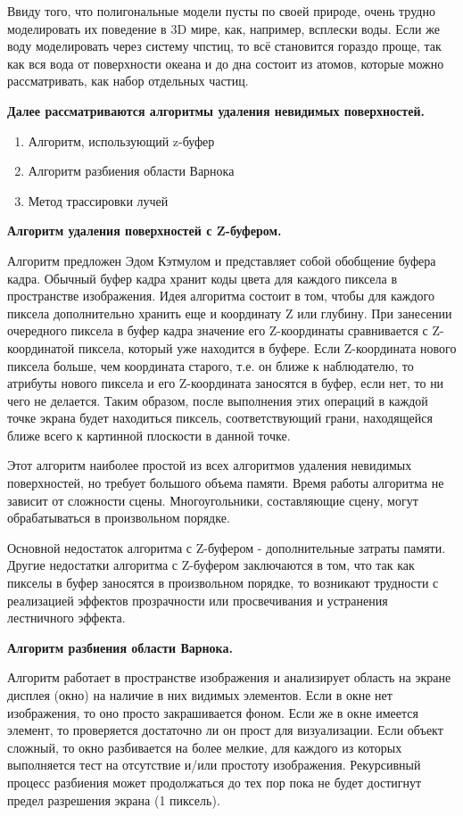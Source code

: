 Ввиду того, что полигональные модели пусты по своей природе, очень трудно моделировать их поведение в 3D мире, как, например, всплески воды. Если же воду моделировать через систему чпстиц, то всё становится гораздо проще, так как вся вода от поверхности океана и до дна состоит из атомов, которые можно рассматривать, как набор отдельных частиц.

\textbf{Далее рассматриваются алгоритмы удаления невидимых поверхностей. } \cite{deletenovisible}

\begin{enumerate}
	\item Алгоритм, использующий z-буфер
	\item Алгоритм разбиения области Варнока
	\item Метод трассировки лучей
\end{enumerate}

\textbf{Алгоритм удаления поверхностей с Z-буфером. }

Алгоритм предложен Эдом Кэтмулом и представляет собой обобщение буфера кадра. Обычный буфер кадра хранит коды цвета для каждого пиксела в пространстве изображения. Идея алгоритма состоит в том, чтобы для каждого пиксела дополнительно хранить еще и координату Z или глубину. При занесении очередного пиксела в буфер кадра значение его Z-координаты сравнивается с Z-координатой пиксела, который уже находится в буфере. Если Z-координата нового пиксела больше, чем координата старого, т.е. он ближе к наблюдателю, то атрибуты нового пиксела и его Z-координата заносятся в буфер, если нет, то ни чего не делается. Таким образом, после выполнения этих операций в каждой точке экрана будет находиться пиксель, соответствующий грани, находящейся ближе всего к картинной плоскости в данной точке.

Этот алгоритм наиболее простой из всех алгоритмов удаления невидимых поверхностей, но требует большого объема памяти. Время работы алгоритма не зависит от сложности сцены. Многоугольники, составляющие сцену, могут обрабатываться в произвольном порядке. 

Основной недостаток алгоритма с Z-буфером - дополнительные затраты памяти. Другие недостатки алгоритма с Z-буфером заключаются в том, что так как пикселы в буфер заносятся в произвольном порядке, то возникают трудности с реализацией эффектов прозрачности или просвечивания и устранения лестничного эффекта. 

\textbf{Алгоритм разбиения области Варнока. }

Алгоритм работает в пространстве изображения и анализирует область на экране дисплея (окно) на наличие в них видимых элементов. Если в окне нет изображения, то оно просто закрашивается фоном. Если же в окне имеется элемент, то проверяется достаточно ли он прост для визуализации. Если объект сложный, то окно разбивается на более мелкие, для каждого из которых выполняется тест на отсутствие и/или простоту изображения. Рекурсивный процесс разбиения может продолжаться до тех пор пока не будет достигнут предел разрешения экрана (1 пиксель).

